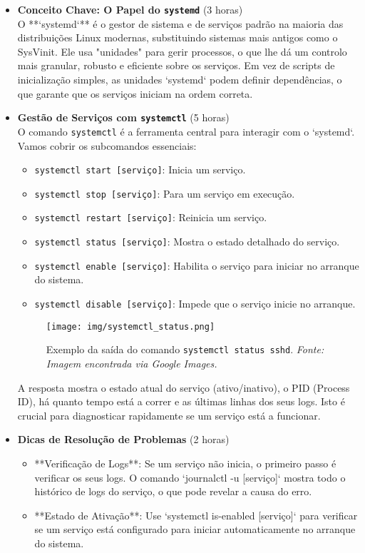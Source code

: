 \documentclass[10pt,a4paper]{article}
\begin{document}
	\begin{itemize}
		\item \textbf{Conceito Chave: O Papel do \texttt{systemd}} (3 horas) \\
		O **`systemd`** é o gestor de sistema e de serviços padrão na maioria das distribuições Linux modernas, substituindo sistemas mais antigos como o SysVinit. Ele usa "unidades" para gerir processos, o que lhe dá um controlo mais granular, robusto e eficiente sobre os serviços. Em vez de scripts de inicialização simples, as unidades `systemd` podem definir dependências, o que garante que os serviços iniciam na ordem correta.
		
		\item \textbf{Gestão de Serviços com \texttt{systemctl}} (5 horas) \\
		O comando \texttt{systemctl} é a ferramenta central para interagir com o `systemd`. Vamos cobrir os subcomandos essenciais:
		\begin{itemize}
			\item \texttt{systemctl start [serviço]}: Inicia um serviço.
			\item \texttt{systemctl stop [serviço]}: Para um serviço em execução.
			\item \texttt{systemctl restart [serviço]}: Reinicia um serviço.
			\item \texttt{systemctl status [serviço]}: Mostra o estado detalhado do serviço.
			\item \texttt{systemctl enable [serviço]}: Habilita o serviço para iniciar no arranque do sistema.
			\item \texttt{systemctl disable [serviço]}: Impede que o serviço inicie no arranque.
		\end{itemize}
		
		\begin{figure}[h]
			\centering
			\texttt{[image: img/systemctl\_status.png]}
			\caption{Exemplo da saída do comando \texttt{systemctl status sshd}. \textit{Fonte: Imagem encontrada via Google Images.}}
			\label{fig:systemctl_status}
		\end{figure}
		
		A resposta mostra o estado atual do serviço (ativo/inativo), o PID (Process ID), há quanto tempo está a correr e as últimas linhas dos seus logs. Isto é crucial para diagnosticar rapidamente se um serviço está a funcionar.
		
		\item \textbf{Dicas de Resolução de Problemas} (2 horas)
		\begin{itemize}
			\item **Verificação de Logs**: Se um serviço não inicia, o primeiro passo é verificar os seus logs. O comando `journalctl -u [serviço]` mostra todo o histórico de logs do serviço, o que pode revelar a causa do erro.
			\item **Estado de Ativação**: Use `systemctl is-enabled [serviço]` para verificar se um serviço está configurado para iniciar automaticamente no arranque do sistema.
		\end{itemize}
		

\end{itemize}
\end{document}
